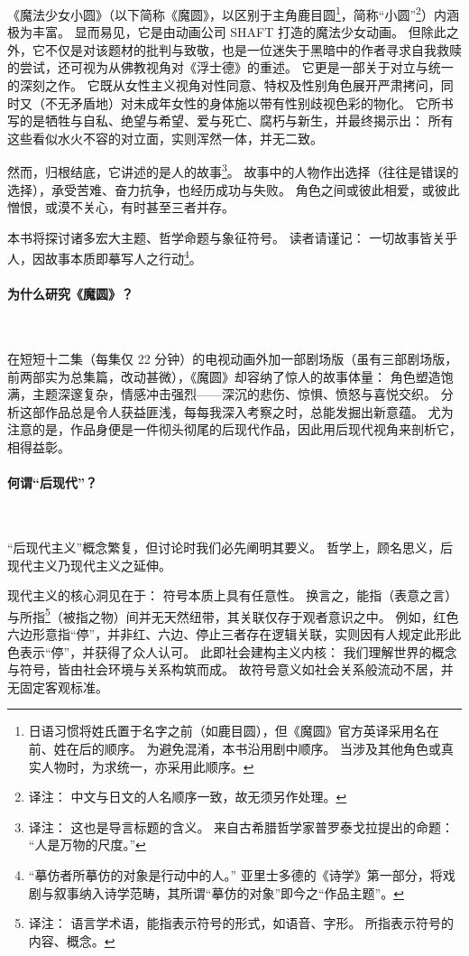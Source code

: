 《魔法少女小圆》（以下简称《魔圆》，以区别于主角鹿目圆\footnote{%
    日语习惯将姓氏置于名字之前（如鹿目圆），但《魔圆》官方英译采用名在前、姓在后的顺序。
    为避免混淆，本书沿用剧中顺序。
    当涉及其他角色或真实人物时，为求统一，亦采用此顺序。
}，简称“小圆”\footnote{%
    译注：
    中文与日文的人名顺序一致，故无须另作处理。
}）内涵极为丰富。
显而易见，它是由动画公司 SHAFT 打造的魔法少女动画。
但除此之外，它不仅是对该题材的批判与致敬，也是一位迷失于黑暗中的作者寻求自我救赎的尝试，还可视为从佛教视角对《浮士德》的重述。
它更是一部关于对立与统一的深刻之作。
它既从女性主义视角对性同意、特权及性别角色展开严肃拷问，同时又（不无矛盾地）对未成年女性的身体施以带有性别歧视色彩的物化。
它所书写的是牺牲与自私、绝望与希望、爱与死亡、腐朽与新生，并最终揭示出：
所有这些看似水火不容的对立面，实则浑然一体，并无二致。

然而，归根结底，它讲述的是人的故事\footnote{%
    译注：
    这也是导言标题的含义。
    来自古希腊哲学家普罗泰戈拉提出的命题：
    “人是万物的尺度。”
}。
故事中的人物作出选择（往往是错误的选择），承受苦难、奋力抗争，也经历成功与失败。
角色之间或彼此相爱，或彼此憎恨，或漠不关心，有时甚至三者并存。

本书将探讨诸多宏大主题、哲学命题与象征符号。
读者请谨记：
一切故事皆关乎人，因故事本质即摹写人之行动\footnote{%
    “摹仿者所摹仿的对象是行动中的人。”
    亚里士多德的《诗学》第一部分，将戏剧与叙事纳入诗学范畴，其所谓“摹仿的对象”即今之“作品主题”。
}\cite{ref1}。
\paragraph{为什么研究《魔圆》？}~{}

在短短十二集（每集仅 22 分钟）的电视动画外加一部剧场版（虽有三部剧场版，前两部实为总集篇，改动甚微），《魔圆》却容纳了惊人的故事体量：
角色塑造饱满，主题深邃复杂，情感冲击强烈——深沉的悲伤、惊惧、愤怒与喜悦交织。
分析这部作品总是令人获益匪浅，每每我深入考察之时，总能发掘出新意蕴。
尤为注意的是，作品身便是一件彻头彻尾的后现代作品，因此用后现代视角来剖析它，相得益彰。
\paragraph{何谓“后现代”？}~{}

“后现代主义”概念繁复，但讨论时我们必先阐明其要义。
哲学上，顾名思义，后现代主义乃现代主义之延伸。

现代主义的核心洞见在于：
符号本质上具有任意性。
换言之，能指（表意之言）与所指\footnote{%
    译注：
    语言学术语，能指表示符号的形式，如语音、字形。
    所指表示符号的内容、概念。
}（被指之物）间并无天然纽带，其关联仅存于观者意识之中。
例如，红色六边形意指“停”，并非红、六边、停止三者存在逻辑关联，实则因有人规定此形此色表示“停”，并获得了众人认可。
此即社会建构主义内核：
我们理解世界的概念与符号，皆由社会环境与关系构筑而成。
故符号意义如社会关系般流动不居，并无固定客观标准\cite{ref2}。

